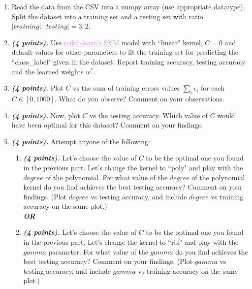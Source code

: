 \documentclass[a4paper]{article}
\begin{document}
\begin{enumerate}[resume]
    \item Read the data from the CSV into a numpy array (use appropriate datatype). Split the dataset into a training set and a testing set with ratio $|training|:|testing| = 3:2$.
    \item \textbf{\textit{(4 points).}} Use \hyperlink{https://scikit-learn.org/stable/modules/generated/sklearn.svm.SVC.html}{\textcolor{violet}{scikit-learn's SVM}} model with ``linear" kernel, $C=0$ and default values for other parameters to fit the training set for predicting the ``class\_label" given in the dataset.  Report training accuracy, testing accuracy and the learned weights $w^*$.
    \item \textbf{\textit{(4 points).}} Plot $C$ vs the sum of training errors values $\sum_i\epsilon_i$ for each $C \in [0,1000]$. What do you observe? Comment on your observations.
    \item \textbf{\textit{(4 points).}} Now, plot $C$ vs the testing accuracy. Which value of $C$ would have been optimal for this dataset? Comment on your findings.
    \item \textbf{\textit{(4 points).}} Attempt anyone of the following:
    \begin{enumerate}
        \item \textbf{\textit{(4 points).}} Let's choose the value of $C$ to be the optimal one you found in the previous part. Let's change the kernel to ``poly" and play with the $degree$ of the polynomial. For what value of the $degree$ of the polynomial kernel do you find achieves the best testing accuracy? Comment on your findings. (Plot $degree$ vs testing accuracy, and include $degree$ vs training accuracy on the same plot.)
    \\
\textit{\textbf{OR}}
        \item \textbf{\textit{(4 points).}} Let's choose the value of $C$ to be the optimal one you found in the previous part. Let's change the kernel to ``rbf" and play with the $gamma$ parameter. For what value of the $gamma$ do you find achieves the best testing accuracy? Comment on your findings. (Plot $gamma$ vs testing accuracy, and include $gamma$ vs training accuracy on the same plot.)
    \end{enumerate}
   
    
\end{enumerate}
\pagebreak
\end{document}
